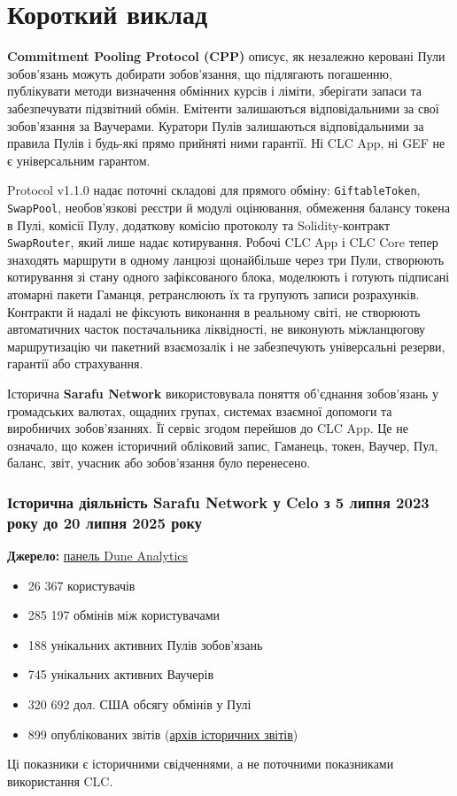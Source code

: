 \documentclass[11pt]{article}
\begin{document}
\section*{Короткий виклад}

\textbf{Commitment Pooling Protocol (CPP)} описує, як незалежно керовані Пули зобов'язань можуть добирати зобов'язання, що підлягають погашенню, публікувати методи визначення обмінних курсів і ліміти, зберігати запаси та забезпечувати підзвітний обмін. Емітенти залишаються відповідальними за свої зобов'язання за Ваучерами. Куратори Пулів залишаються відповідальними за правила Пулів і будь-які прямо прийняті ними гарантії. Ні CLC App, ні GEF не є універсальним гарантом.

Protocol v1.1.0 надає поточні складові для прямого обміну: \texttt{GiftableToken}, \texttt{SwapPool}, необов'язкові реєстри й модулі оцінювання, обмеження балансу токена в Пулі, комісії Пулу, додаткову комісію протоколу та Solidity-контракт \texttt{SwapRouter}, який лише надає котирування. Робочі CLC App і CLC Core тепер знаходять маршрути в одному ланцюзі щонайбільше через три Пули, створюють котирування зі стану одного зафіксованого блока, моделюють і готують підписані атомарні пакети Гаманця, ретранслюють їх та групують записи розрахунків. Контракти й надалі не фіксують виконання в реальному світі, не створюють автоматичних часток постачальника ліквідності, не виконують міжланцюгову маршрутизацію чи пакетний взаємозалік і не забезпечують універсальні резерви, гарантії або страхування.

Історична \textbf{Sarafu Network} використовувала поняття об'єднання зобов'язань у громадських валютах, ощадних групах, системах взаємної допомоги та виробничих зобов'язаннях. Її сервіс згодом перейшов до CLC App. Це не означало, що кожен історичний обліковий запис, Гаманець, токен, Ваучер, Пул, баланс, звіт, учасник або зобов'язання було перенесено.

\subsubsection*{Історична діяльність Sarafu Network у Celo з 5 липня 2023 року до 20 липня 2025 року}

\textbf{Джерело:} \href{https://dune.com/grassrootseconomics/sarafu-network}{панель Dune Analytics}

\begin{itemize}[leftmargin=*]
\item 26 367 користувачів
\item 285 197 обмінів між користувачами
\item 188 унікальних активних Пулів зобов'язань
\item 745 унікальних активних Ваучерів
\item 320 692 дол. США обсягу обмінів у Пулі
\item 899 опублікованих звітів (\href{https://sarafu.network/reports}{архів історичних звітів})
\end{itemize}
Ці показники є історичними свідченнями, а не поточними показниками використання CLC.
\end{document}
